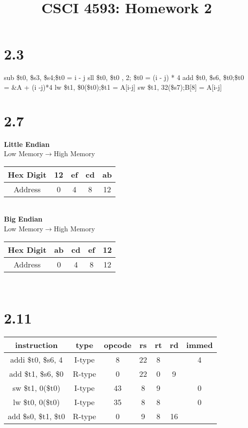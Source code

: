 \documentclass[12pt]{article}
\begin{document}
	
\title{CSCI 4593: Homework 2}
\author{}
\date{}

\maketitle

\section*{2.3}
sub \$t0, \$s3, \$s4;\hspace{10mm}\$t0 = i - j\newline
sll \$t0, \$t0 , 2; \hspace{10mm} \$t0 = (i - j) * 4\newline
add \$t0, \$s6, \$t0;\hspace{10mm}\$t0 = \&A + (i -j)*4\newline
lw \$t1, \$0(\$t0);\hspace{11mm}\$t1 = A[i-j]\newline
sw \$t1, 32(\$s7);\hspace{12mm}B[8] = A[i-j]\newline

\section*{2.7}
\textbf{Little Endian}\\
Low Memory$\rightarrow$High Memory\\
\begin{tabular}{|c|c|c|c|c|}
	\hline
	Hex Digit & 12 & ef & cd & ab\\
	\hline
	Address & 0 & 4 & 8 & 12\\
	\hline
\end{tabular}\\
\newline
\textbf{Big Endian}\\
Low Memory$\rightarrow$High Memory\\
\begin{tabular}{|c|c|c|c|c|}
	\hline
	Hex Digit & ab & cd & ef & 12\\
	\hline
	Address & 0 & 4 & 8 & 12\\
	\hline
\end{tabular}\\

\section*{2.11}
\begin{tabular}{|c|c|c|c|c|c|c|}
	\hline
	instruction & type & opcode & rs & rt & rd & immed\\
	\hline
	addi \$t0, \$s6, 4 & I-type & 8 & 22 & 8 && 4\\
	\hline
	add \$t1, \$s6, \$0 & R-type & 0 & 22 & 0 & 9 & \\
	\hline
	sw \$t1, 0(\$t0) & I-type & 43 & 8 & 9 & & 0\\
	\hline
	lw \$t0, 0(\$t0) & I-type & 35 & 8 & 8 & & 0\\
	\hline
	add \$s0, \$t1, \$t0 & R-type & 0 & 9 & 8 & 16 & \\
	\hline
\end{tabular}
\end{document}
